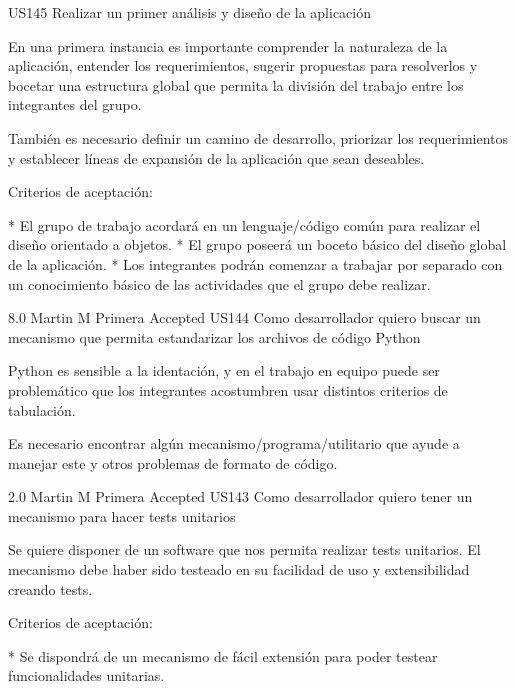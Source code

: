 \userStory
	{US145} %
	{Realizar un primer análisis y diseño de la aplicación} %
	{En una primera instancia es importante comprender la naturaleza de la
aplicación, entender los requerimientos, sugerir propuestas para resolverlos y
bocetar una estructura global que permita la división del trabajo entre los
integrantes del grupo.

  

También es necesario definir un camino de desarrollo, priorizar los
requerimientos y establecer líneas de expansión de la aplicación que sean
deseables.

  
Criterios de aceptación:

* El grupo de trabajo acordará en un lenguaje/código común para realizar el diseño orientado a objetos.  
* El grupo poseerá un boceto básico del diseño global de la aplicación.  
* Los integrantes podrán comenzar a trabajar por separado con un conocimiento básico de las actividades que el grupo debe realizar.  

} %
	{} %
	{8.0} %
	{Martin M} %
	{Primera} %
	{Accepted} %
\userStory
	{US144} %
	{Como desarrollador quiero buscar un mecanismo que permita estandarizar los archivos de código Python} %
	{Python es sensible a la identación, y en el trabajo en equipo puede ser
problemático que los integrantes acostumbren usar distintos criterios de
tabulación.

  

Es necesario encontrar algún mecanismo/programa/utilitario que ayude a manejar
este y otros problemas de formato de código.

} %
	{} %
	{2.0} %
	{Martin M} %
	{Primera} %
	{Accepted} %
\userStory
	{US143} %
	{Como desarrollador quiero tener un mecanismo para hacer tests unitarios} %
	{Se quiere disponer de un software que nos permita realizar tests unitarios. El
mecanismo debe haber sido testeado en su facilidad de uso y extensibilidad
creando tests.

  
  
Criterios de aceptación:

  
* Se dispondrá de un mecanismo de fácil extensión para poder testear funcionalidades unitarias. 

} %

